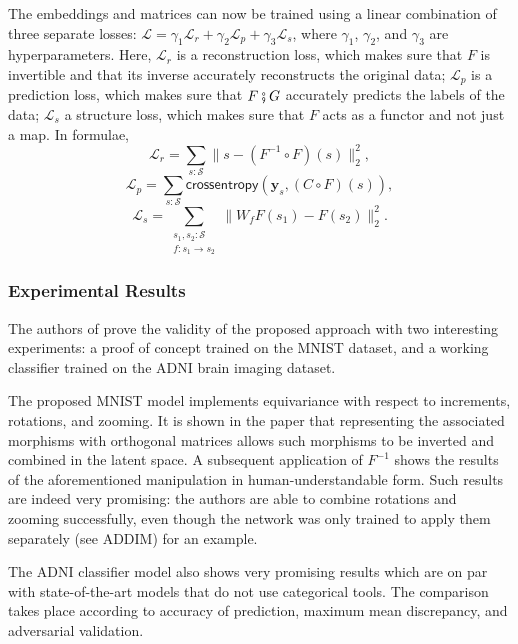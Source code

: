 \documentclass[11pt,a4paper,openright,twoside]{report}
\theoremstyle{plain}
\theoremstyle{definition}
\begin{document}
The embeddings and matrices can now be trained using a linear combination of three separate losses: $\mathcal{L} = \gamma_1\mathcal{L}_r + \gamma_2\mathcal{L}_p + \gamma_3\mathcal{L}_s$, where $\gamma_1$, $\gamma_2$, and $\gamma_3$ are hyperparameters. Here, $\mathcal{L}_r$ is a reconstruction loss, which makes sure that $F$ is invertible and that its inverse accurately reconstructs the original data; $\mathcal{L}_p$ is a prediction loss, which makes sure that $F \fatsemi G$ accurately predicts the labels of the data; $\mathcal{L}_s$ a structure loss, which makes sure that $F$ acts as a functor and not just a map. In formulae,
\[\mathcal{L}_r = \sum_{s : \mathcal{S}}\|s-(F^{-1} \circ F)(s)\|^2_2,\]
\[\mathcal{L}_p = \sum_{s : \mathcal{S}}\mathsf{crossentropy}(\mathbf{y}_s,(C \circ F)(s)),\]
\[\mathcal{L}_s = \sum_{\begin{smallmatrix}s_1, s_2 : \mathcal{S} \\ f: s_1 \to s_2 \end{smallmatrix}}\|W_fF(s_1)-F(s_2)\|^2_2.\]

\subsubsection{Experimental Results}

The authors of \cite{chytas2024poolingimagedatasetsmultiple} prove the validity of the proposed approach with two interesting experiments: a proof of concept trained on the MNIST dataset, and a working classifier trained on the ADNI brain imaging dataset.

The proposed MNIST model implements equivariance with respect to increments, rotations, and zooming. It is shown in the paper that representing the associated morphisms with orthogonal matrices allows such morphisms to be inverted and combined in the latent space. A subsequent application of $F^{-1}$ shows the results of the aforementioned manipulation in human-understandable form. Such results are indeed very promising: the authors are able to combine rotations and zooming successfully, even though the network was only trained to apply them separately (see ADDIM) for an example.


The ADNI classifier model also shows very promising results which are on par with state-of-the-art models that do not use categorical tools. The comparison takes place according to accuracy of prediction, maximum mean discrepancy, and adversarial validation.
\end{document}
